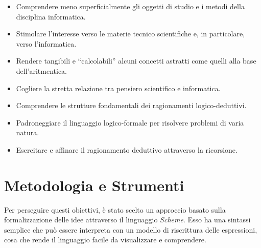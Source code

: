 \documentclass[withtimes]{easychair}
\begin{document}
\begin{itemize}
 \item Comprendere meno superficialmente gli oggetti di studio e i metodi   della disciplina informatica.%
  \item Stimolare l'interesse verso le materie tecnico scientifiche e, in   particolare, verso l'informatica.
  \item Rendere tangibili e ``calcolabili'' alcuni concetti astratti come quelli alla base dell'aritmentica.
  \item Cogliere la stretta relazione tra pensiero scientifico e informatica. %
 \item Comprendere le strutture fondamentali dei ragionamenti logico-deduttivi.
 \item Padroneggiare il linguaggio logico-formale per risolvere problemi di varia natura.
 \item Esercitare e affinare il ragionamento deduttivo attraverso la ricorsione.
\end{itemize}


\section{Metodologia e Strumenti}\label{metodologia-e-strumenti}

Per perseguire questi obiettivi, è stato scelto un approccio basato sulla formalizzazione delle idee attraverso il linguaggio \emph{Scheme}. Esso ha una sintassi semplice che può essere interpreta con un modello di riscrittura delle espressioni, cosa che rende il linguaggio facile da visualizzare e comprendere. %
\end{document}
